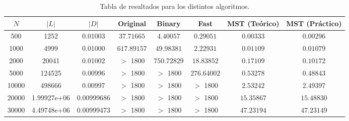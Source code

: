 \begin{table}[H]
\begin{tabular}{cccccccc}
\hline
 $N$    &    $|L|$      &     $|D|$     &      Original         &       Binary          &        Fast           &      MST (Teórico)    &    MST (Práctico)        \\
\hline
 500    & 1252          & 0.01003       &  $37.71665$           & $4.40057$             & $0.29051$             &     $0.00333$         &     $0.00296$            \\
 1000   & 4999          & 0.01000       &  $617.89157$          & $49.98381$            & $2.22931$             &     $0.01109$         &     $0.01079$            \\
 2000   & 20041         & 0.01002       &  \ensuremath{>} 1800  & $750.72829$           & $18.83852$            &     $0.17109$         &     $0.10172$            \\
 5000   & 124525        & 0.00996       &  \ensuremath{>} 1800  & \ensuremath{>} 1800   & $276.64002$           &     $0.53278$         &     $0.48843$            \\
 10000  & 498666        & 0.00997       &  \ensuremath{>} 1800  & \ensuremath{>} 1800   & \ensuremath{>} 1800   &     $2.53242$         &     $2.49397$            \\
 20000  & 1.99927e+06   & 0.00999686    &  \ensuremath{>} 1800  & \ensuremath{>} 1800   & \ensuremath{>} 1800   &     $15.35867$        &     $15.48830$           \\
 30000  & 4.49748e+06   & 0.00999473    &  \ensuremath{>} 1800  & \ensuremath{>} 1800   & \ensuremath{>} 1800   &     $47.23194$        &     $47.23149$           \\
\hline
\end{tabular}
\caption{Tabla de resultados para los distintos algoritmos.}
\label{result}
\end{table}
